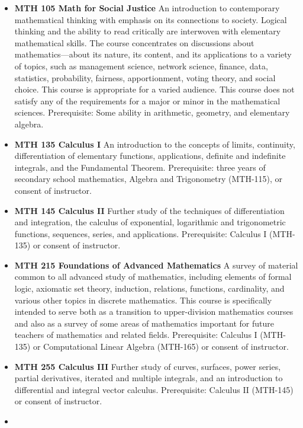 \documentclass[
  letterpaper,
]{scrbook}
\providecommand{\tightlist}{%
  \setlength{\itemsep}{0pt}\setlength{\parskip}{0pt}}
\begin{document}
\begin{itemize}
\tightlist
\item
  \textbf{MTH 105 Math for Social Justice} An introduction to
  contemporary mathematical thinking with emphasis on its connections to
  society. Logical thinking and the ability to read critically are
  interwoven with elementary mathematical skills. The course
  concentrates on discussions about mathematics---about its nature, its
  content, and its applications to a variety of topics, such as
  management science, network science, finance, data, statistics,
  probability, fairness, apportionment, voting theory, and social
  choice. This course is appropriate for a varied audience. This course
  does not satisfy any of the requirements for a major or minor in the
  mathematical sciences. Prerequisite: Some ability in arithmetic,
  geometry, and elementary algebra.
\item
  \textbf{MTH 135 Calculus I} An introduction to the concepts of limits,
  continuity, differentiation of elementary functions, applications,
  definite and indefinite integrals, and the Fundamental Theorem.
  Prerequisite: three years of secondary school mathematics, Algebra and
  Trigonometry (MTH-115), or consent of instructor.
\item
  \textbf{MTH 145 Calculus II} Further study of the techniques of
  differentiation and integration, the calculus of exponential,
  logarithmic and trigonometric functions, sequences, series, and
  applications. Prerequisite: Calculus I (MTH-135) or consent of
  instructor.
\item
  \textbf{MTH 215 Foundations of Advanced Mathematics} A survey of
  material common to all advanced study of mathematics, including
  elements of formal logic, axiomatic set theory, induction, relations,
  functions, cardinality, and various other topics in discrete
  mathematics. This course is specifically intended to serve both as a
  transition to upper-division mathematics courses and also as a survey
  of some areas of mathematics important for future teachers of
  mathematics and related fields. Prerequisite: Calculus I (MTH-135) or
  Computational Linear Algebra (MTH-165) or consent of instructor.
\item
  \textbf{MTH 255 Calculus III} Further study of curves, surfaces, power
  series, partial derivatives, iterated and multiple integrals, and an
  introduction to differential and integral vector calculus.
  Prerequisite: Calculus II (MTH-145) or consent of instructor.
\item

\end{itemize}
\end{document}
